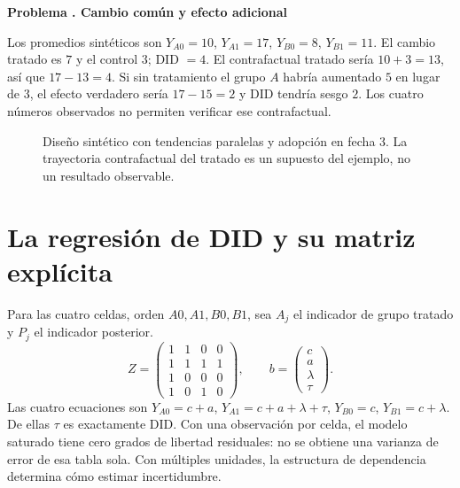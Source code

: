 \documentclass[11pt,a4paper]{article}
\theoremstyle{definition}
\newcounter{problema}
\newenvironment{resuelto}[1]{\refstepcounter{problema}\par\medskip\Needspace{6\baselineskip}\textbf{Problema \theproblema. #1}\par}{\par\medskip}
\begin{document}
\begin{resuelto}{Cambio común y efecto adicional}
Los promedios sintéticos son
$Y_{A0}=10$, $Y_{A1}=17$, $Y_{B0}=8$, $Y_{B1}=11$.
El cambio tratado es $7$ y el control $3$; DID $=4$.
El contrafactual tratado sería $10+3=13$, así que $17-13=4$.
Si sin tratamiento el grupo $A$ habría aumentado $5$ en lugar de $3$, el efecto verdadero sería $17-15=2$ y DID tendría sesgo $2$.
Los cuatro números observados no permiten verificar ese contrafactual.
\end{resuelto}



\begin{figure}[htbp]\centering
{}
\caption{Diseño sintético con tendencias paralelas y adopción en fecha 3. La trayectoria contrafactual del tratado es un supuesto del ejemplo, no un resultado observable.}\label{fig:panel-15}
\end{figure}
\section{La regresión de DID y su matriz explícita}
Para las cuatro celdas, orden $A0,A1,B0,B1$, sea $A_j$ el indicador de grupo tratado y $P_j$ el indicador posterior.
\[
Z=\begin{pmatrix}
1&1&0&0\\
1&1&1&1\\
1&0&0&0\\
1&0&1&0
\end{pmatrix},\qquad
b=\begin{pmatrix}c\\a\\\lambda\\\tau\end{pmatrix}.
\]
Las cuatro ecuaciones son
$Y_{A0}=c+a$,
$Y_{A1}=c+a+\lambda+\tau$,
$Y_{B0}=c$,
$Y_{B1}=c+\lambda$.
De ellas $\tau$ es exactamente DID.
Con una observación por celda, el modelo saturado tiene cero grados de libertad residuales: no se obtiene una varianza de error de esa tabla sola.
Con múltiples unidades, la estructura de dependencia determina cómo estimar incertidumbre.
\end{document}
